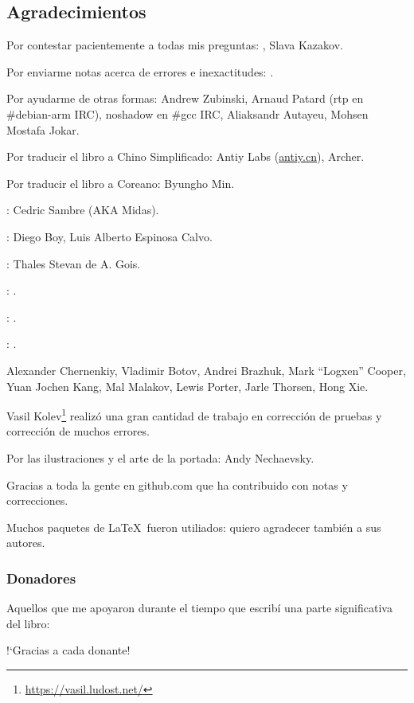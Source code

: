 \subsection*{Agradecimientos}

Por contestar pacientemente a todas mis preguntas: \HERMIT, Slava  Kazakov.

Por enviarme notas acerca de errores e inexactitudes: \PeopleMistakesInaccuracies{}.

Por ayudarme de otras formas:
Andrew Zubinski,
Arnaud Patard (rtp en \#debian-arm IRC),
noshadow en \#gcc IRC,
Aliaksandr Autayeu,
Mohsen Mostafa Jokar.

Por traducir el libro a Chino Simplificado:
Antiy Labs (\href{http://antiy.cn}{antiy.cn}), Archer.

Por traducir el libro a Coreano: Byungho Min.

\ESph{}: Cedric Sambre (AKA Midas).

\ESph{}: Diego Boy, Luis Alberto Espinosa Calvo.

\ESph{}: Thales Stevan de A. Gois.

\ESph{}: \PeopleItalianTranslators{}.

\ESph{}: \PeopleFrenchTranslators{}.

\DEph{}: \PeopleGermanTranslators{}.

%
Alexander  Chernenkiy,
Vladimir Botov,
Andrei Brazhuk,
Mark ``Logxen'' Cooper, Yuan Jochen Kang, Mal Malakov, Lewis Porter, Jarle Thorsen, Hong Xie.

Vasil Kolev\footnote{\url{https://vasil.ludost.net/}} realiz\'o una gran cantidad de trabajo en correcci\'on de pruebas y correcci\'on de muchos errores.

Por las ilustraciones y el arte de la portada: Andy Nechaevsky.

Gracias a toda la gente en github.com que ha contribuido con notas y correcciones.

Muchos paquetes de \LaTeX\ fueron utiliados: quiero agradecer tambi\'en a sus autores.

\subsubsection*{Donadores}

Aquellos que me apoyaron durante el tiempo que escrib\'i una parte significativa del libro:



!`Gracias a cada donante!

